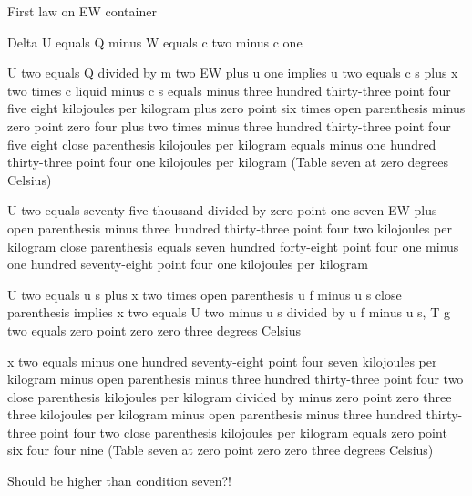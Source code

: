 First law on EW container

Delta U equals Q minus W equals c two minus c one

U two equals Q divided by m two EW plus u one implies u two equals c s plus x two times c liquid minus c s equals minus three hundred thirty-three point four five eight kilojoules per kilogram plus zero point six times open parenthesis minus zero point zero four plus two times minus three hundred thirty-three point four five eight close parenthesis kilojoules per kilogram equals minus one hundred thirty-three point four one kilojoules per kilogram (Table seven at zero degrees Celsius)

U two equals seventy-five thousand divided by zero point one seven EW plus open parenthesis minus three hundred thirty-three point four two kilojoules per kilogram close parenthesis equals seven hundred forty-eight point four one minus one hundred seventy-eight point four one kilojoules per kilogram

U two equals u s plus x two times open parenthesis u f minus u s close parenthesis implies x two equals U two minus u s divided by u f minus u s, T g two equals zero point zero zero three degrees Celsius

x two equals minus one hundred seventy-eight point four seven kilojoules per kilogram minus open parenthesis minus three hundred thirty-three point four two close parenthesis kilojoules per kilogram divided by minus zero point zero three three kilojoules per kilogram minus open parenthesis minus three hundred thirty-three point four two close parenthesis kilojoules per kilogram equals zero point six four four nine (Table seven at zero point zero zero three degrees Celsius)

Should be higher than condition seven?!